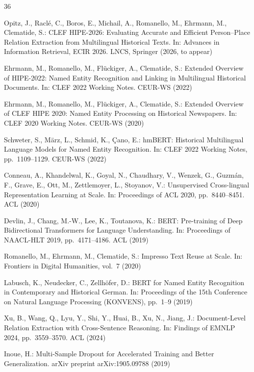 \documentclass[11pt,a4paper]{article}
\begin{document}
\begin{thebibliography}{36}

Opitz, J., Racl\'e, C., Boros, E., Michail, A., Romanello, M., Ehrmann, M., Clematide, S.:
CLEF HIPE-2026: Evaluating Accurate and Efficient Person--Place Relation Extraction from Multilingual Historical Texts.
In: Advances in Information Retrieval, ECIR 2026. LNCS, Springer (2026, to appear)

Ehrmann, M., Romanello, M., Fl\"uckiger, A., Clematide, S.:
Extended Overview of HIPE-2022: Named Entity Recognition and Linking in Multilingual Historical Documents.
In: CLEF 2022 Working Notes. CEUR-WS (2022)

Ehrmann, M., Romanello, M., Fl\"uckiger, A., Clematide, S.:
Extended Overview of CLEF HIPE 2020: Named Entity Processing on Historical Newspapers.
In: CLEF 2020 Working Notes. CEUR-WS (2020)

Schweter, S., M\"arz, L., Schmid, K., \c{C}ano, E.:
hmBERT: Historical Multilingual Language Models for Named Entity Recognition.
In: CLEF 2022 Working Notes, pp.~1109--1129. CEUR-WS (2022)

Conneau, A., Khandelwal, K., Goyal, N., Chaudhary, V., Wenzek, G., Guzm\'an, F., Grave, E., Ott, M., Zettlemoyer, L., Stoyanov, V.:
Unsupervised Cross-lingual Representation Learning at Scale.
In: Proceedings of ACL 2020, pp.~8440--8451. ACL (2020)

Devlin, J., Chang, M.-W., Lee, K., Toutanova, K.:
BERT: Pre-training of Deep Bidirectional Transformers for Language Understanding.
In: Proceedings of NAACL-HLT 2019, pp.~4171--4186. ACL (2019)

Romanello, M., Ehrmann, M., Clematide, S.:
Impresso Text Reuse at Scale.
In: Frontiers in Digital Humanities, vol.~7 (2020)

Labusch, K., Neudecker, C., Zellh\"ofer, D.:
BERT for Named Entity Recognition in Contemporary and Historical German.
In: Proceedings of the 15th Conference on Natural Language Processing (KONVENS), pp.~1--9 (2019)

Xu, B., Wang, Q., Lyu, Y., Shi, Y., Huai, B., Xu, N., Jiang, J.:
Document-Level Relation Extraction with Cross-Sentence Reasoning.
In: Findings of EMNLP 2024, pp.~3559--3570. ACL (2024)

Inoue, H.:
Multi-Sample Dropout for Accelerated Training and Better Generalization.
arXiv preprint arXiv:1905.09788 (2019)


\end{thebibliography}
\end{document}
